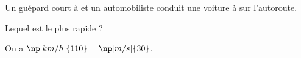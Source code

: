 
\hauteurLargeurCadreReponse		{6mm}{3cm}
\typeEntrainement				{} %
\initialisationEntrainement

Un guépard court à  et un automobiliste conduit une voiture à  sur l’autoroute.

\debutEntrainement



\begin{enonce}
Lequel est le plus rapide ?
\end{enonce}


\begin{corrige}
On a $\np[km/h]{110} =  \np[m/s]{30}$.
\end{corrige}



\finEntrainement








\hauteurLargeurCadreReponse		{6mm}{2cm}
\typeEntrainement				{} %
\initialisationEntrainement


